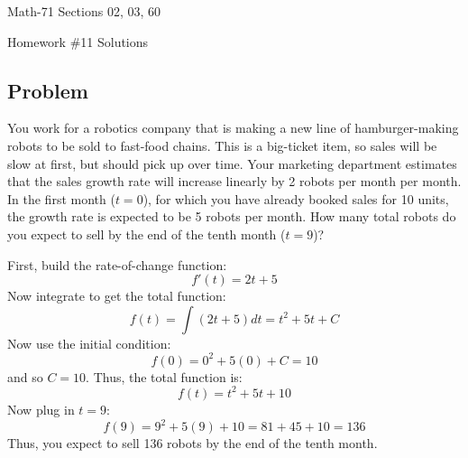 \documentclass[letterpaper,12pt,fleqn]{article}
\begin{document}
\begin{center}
  \large
  Math-71 Sections 02, 03, 60

  \Large
  Homework \#11 Solutions
\end{center}

\subsection*{Problem}

You work for a robotics company that is making a new line of hamburger-making robots to be sold to fast-food
chains.  This is a big-ticket item, so sales will be slow at first, but should pick up over time.  Your marketing
department estimates that the sales growth rate will increase linearly by 2 robots per month per month.  In the
first month (\(t=0\)), for which you have already booked sales for 10 units, the growth rate is expected to be 5
robots per month.  How many total robots do you expect to sell by the end of the tenth month (\(t=9\))?

First, build the rate-of-change function:
\[f'(t)=2t+5\]
Now integrate to get the total function:
\[f(t)=\int(2t+5)dt=t^2+5t+C\]
Now use the initial condition:
\[f(0)=0^2+5(0)+C=10\]
and so \(C=10\).  Thus, the total function is:
\[f(t)=t^2+5t+10\]
Now plug in \(t=9\):
\[f(9)=9^2+5(9)+10=81+45+10=136\]
Thus, you expect to sell 136 robots by the end of the tenth month.
\end{document}
